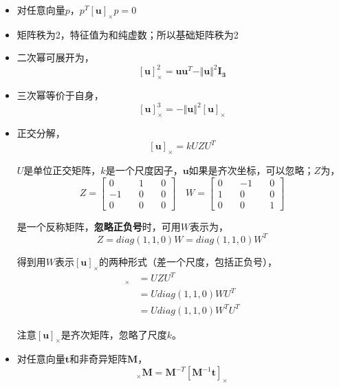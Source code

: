 	\begin{itemize}
		\item 对任意向量$p$，$p^T [\mathbf{u}]_{\times} p = 0$
		\item 矩阵秩为2，特征值为和纯虚数；所以基础矩阵秩为2
		\item 二次幂可展开为，
			$$
				[\mathbf{u}]_{\times}^2 = \mathbf{u}\mathbf{u}^T - \Vert\mathbf{u}\Vert^2 \mathbf{I_3}
			$$
		\item 三次幂等价于自身，
			$$
				[\mathbf{u}]_{\times}^3 = -\Vert\mathbf{u}\Vert^2[\mathbf{u}]_{\times}
			$$
		\item 正交分解，
			$$
				[\mathbf{u}]_{\times} = kUZU^T
			$$

			$U$是单位正交矩阵，$k$是一个尺度因子，$\mathbf{u}$如果是齐次坐标，可以忽略；$Z$为，
			$$
				Z = \begin{bmatrix}
					0 \quad& 1\quad& 0\\
					-1 \quad& 0\quad& 0\\
					0 \quad& 0\quad& 0
				\end{bmatrix}
				\quad
				 W = \begin{bmatrix}
					0 \quad& -1\quad& 0\\
					1 \quad& 0\quad& 0\\
					0 \quad& 0\quad& 1
				\end{bmatrix}
			$$

			是一个反称矩阵，\textbf{忽略正负号}时，可用$W$表示为，
			$$
				Z = diag(1,1,0)W = diag(1,1,0)W^T
			$$

			得到用$W$表示$[\mathbf{u}]_{\times}$的两种形式（差一个尺度，包括正负号），
			\begin{align}
				[\mathbf{u}]_{\times} &= UZU^T \label{inverse_decompose}\\
				&= U diag(1,1,0)WU^T\\
				&= U diag(1,1,0)W^TU^T
			\end{align}

			注意$[\mathbf{u}]_{\times}$是齐次矩阵，忽略了尺度$k$。

		\item 对任意向量$\mathbf{t}$和非奇异矩阵$\mathbf{M}$，
			\begin{equation}
				[\mathbf{t}]_{\times}\mathbf{M} = \mathbf{M}^{-T}\left[\mathbf{M}^{-1}\mathbf{t}\right]_{\times} \label {inver_m_p}
			\end{equation}
	\end{itemize}